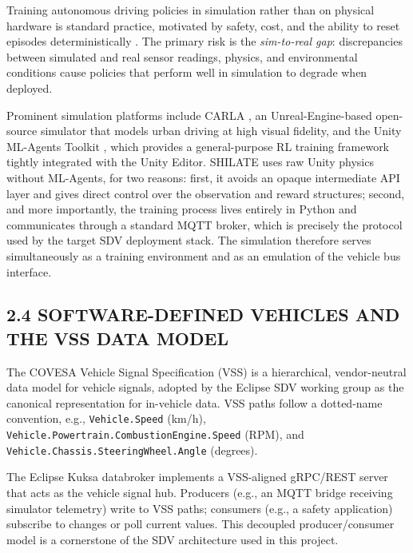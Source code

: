\documentclass[12pt,a4paper]{article}
\begin{document}
\indent Training autonomous driving policies in simulation rather than on physical
hardware is standard practice, motivated by safety, cost, and the ability to
reset episodes deterministically \cite{Kiran2021}. The primary risk is the
\emph{sim-to-real gap}: discrepancies between simulated and real sensor readings,
physics, and environmental conditions cause policies that perform well in
simulation to degrade when deployed.

Prominent simulation platforms include CARLA \cite{Dosovitskiy2017}, an
Unreal-Engine-based open-source simulator that models urban driving at high
visual fidelity, and the Unity ML-Agents Toolkit \cite{Juliani2020}, which
provides a general-purpose RL training framework tightly integrated with the
Unity Editor. SHILATE uses raw Unity physics without ML-Agents, for two
reasons: first, it avoids an opaque intermediate API layer and gives direct
control over the observation and reward structures; second, and more
importantly, the training process lives entirely in Python and communicates
through a standard MQTT broker, which is precisely the protocol used by the
target SDV deployment stack. The simulation therefore serves simultaneously as
a training environment and as an emulation of the vehicle bus interface.

\subsection*{2.4 \quad SOFTWARE-DEFINED VEHICLES AND THE VSS DATA MODEL}

\indent The COVESA Vehicle Signal Specification (VSS) \cite{COVESA2023} is a
hierarchical, vendor-neutral data model for vehicle signals, adopted by the
Eclipse SDV working group as the canonical representation for in-vehicle data.
VSS paths follow a dotted-name convention, e.g., \texttt{Vehicle.Speed} (km/h),
\texttt{Vehicle.Powertrain.CombustionEngine.Speed} (RPM), and
\texttt{Vehicle.Chassis.SteeringWheel.Angle} (degrees).

The Eclipse Kuksa databroker \cite{EclipseKuksa2024} implements a VSS-aligned
gRPC/REST server that acts as the vehicle signal hub. Producers (e.g., an
MQTT bridge receiving simulator telemetry) write to VSS paths; consumers (e.g.,
a safety application) subscribe to changes or poll current values. This
decoupled producer/consumer model is a cornerstone of the SDV architecture
used in this project.
\end{document}

